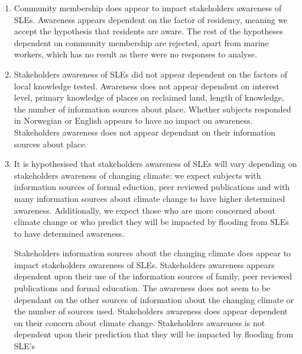 \begin{enumerate}
    \item Community membership does appear to impact stakeholders awareness of SLEs. Awareness appears dependent on the factor of residency, meaning we accept the hypothesis that residents are aware. The rest of the hypotheses dependent on community membership are rejected, apart from marine workers, which has no result as there were no responses to analyse.
  
    \item Stakeholders awareness of SLEs did not appear dependent on the factors of local knowledge tested. Awareness does not appear dependent on interest level, primary knowledge of places on reclaimed land, length of knowledge, the number of information sources about place. Whether subjects responded in Norwegian or English appears to have no impact on awareness. Stakeholders awareness does not appear dependant on their information sources about place. 

    \item It is hypothesised that stakeholders awareness of SLEs will vary depending on stakeholders awareness of changing climate: we expect subjects with information sources of formal eduction, peer reviewed publications and with many information sources about climate change to have higher determined awareness. Additionally, we expect those who are more concerned about climate change or who predict they will be impacted by flooding from SLEs to have determined awareness. 

    Stakeholders information sources about the changing climate does appear to impact stakeholders awareness of SLEs. Stakeholders awareness appears dependent upon their use of the information sources of family, peer reviewed publications and formal education. The awareness does not seem to be dependant on the other sources of information about the changing climate or the number of sources used. Stakeholders awareness does appear dependent on their concern about climate change. Stakeholders awareness is not dependent upon their prediction that they will be impacted by flooding from SLE's
\end{enumerate}


